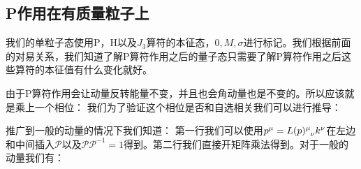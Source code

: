 \subsection{P作用在有质量粒子上}
我们的单粒子态使用P，H以及$ J_3 $算符的本征态，$ 0,M,\sigma $进行标记。我们根据前面的对易关系，我们知道了解P算符作用之后的量子态只需要了解P算符作用之后这些算符的本征值有什么变化就好。

由于P算符作用会让动量反转能量不变，并且也会角动量也是不变的。所以应该就是乘上一个相位：
我们为了验证这个相位是否和自选相关我们可以进行推导：


推广到一般的动量的情况下我们知道：
第一行我们可以使用$ p^\mu = \tensor{L(p)}{^\mu_\nu}k^\nu $在左边和中间插入$ \mathscr{P} $以及$ \mathscr{P}\mathscr{P}^{-1} = 1 $得到。第二行我们直接开矩阵乘法得到。对于一般的动量我们有：


